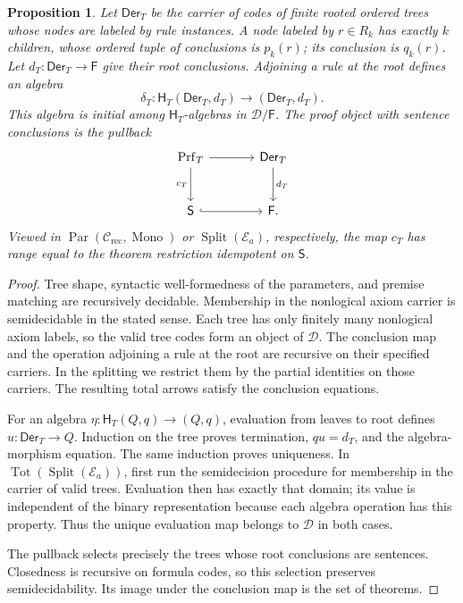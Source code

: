 \documentclass[11pt]{article}
\newtheorem{proposition}[theorem]{Proposition}
\begin{document}
\begin{proposition}\label{prop:first-order-proof-initial}
Let $\mathsf{Der}_T$ be the carrier of codes of finite rooted ordered
trees whose nodes are labeled by rule instances. A node labeled by
$r\in R_k$ has exactly $k$ children, whose ordered tuple of conclusions
is $p_k(r)$; its conclusion is $q_k(r)$. Let
$d_T:\mathsf{Der}_T\to\mathsf F$ give their root conclusions.
Adjoining a rule at the root defines an algebra
\[
 \delta_T:\mathsf H_T(\mathsf{Der}_T,d_T)
       \longrightarrow(\mathsf{Der}_T,d_T).
\]
This algebra is initial among $\mathsf H_T$-algebras in
$\mathcal D/\mathsf F$.
The proof object with sentence conclusions is the pullback
\[
\begin{tikzcd}[column sep=large,row sep=large]
 \mathrm{Prf}_T \arrow[r] \arrow[d,"c_T"'] &
 \mathsf{Der}_T \arrow[d,"d_T"] \\
 \mathsf S \arrow[r,hook] & \mathsf F.
\end{tikzcd}
\]
Viewed in $\operatorname{Par}(\mathcal C_{\mathrm{rec}},\operatorname{Mono})$
or $\operatorname{Split}(\mathcal E_a)$, respectively, the map $c_T$
has range equal to the theorem restriction idempotent on $\mathsf S$.
\end{proposition}
\begin{proof}
Tree shape, syntactic well-formedness of the parameters, and premise
matching are recursively decidable. Membership in the nonlogical
axiom carrier is semidecidable in the stated sense. Each tree has
only finitely many nonlogical axiom labels, so the valid tree codes
form an object of $\mathcal D$.
The conclusion map and the operation adjoining a rule at the root are
recursive on their specified carriers. In the splitting we restrict them by the partial
identities on those carriers. The resulting total arrows satisfy the
conclusion equations.

For an algebra $\eta:\mathsf H_T(Q,q)\to(Q,q)$, evaluation from
leaves to root defines $u:\mathsf{Der}_T\to Q$.
Induction on the tree proves termination, $qu=d_T$, and the
algebra-morphism equation. The same induction proves uniqueness. In
$\operatorname{Tot}(\operatorname{Split}(\mathcal E_a))$, first run the
semidecision procedure for membership in the carrier of valid trees.
Evaluation then has exactly that domain; its value is independent of
the binary representation because each algebra operation has this property. Thus the unique evaluation map belongs to
$\mathcal D$ in both cases.

The pullback selects precisely the trees whose root conclusions are
sentences. Closedness is recursive on formula codes, so this selection
preserves semidecidability. Its image under the conclusion map is the
set of theorems.
\end{proof}
\end{document}

